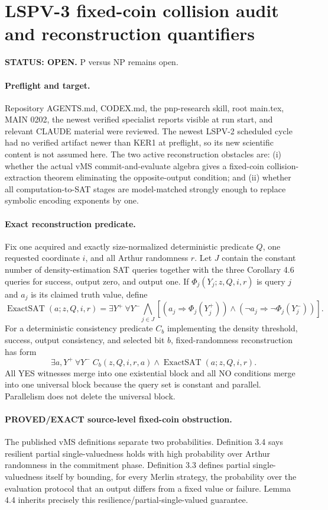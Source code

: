 \documentclass[11pt]{article}
\begin{document}
\section*{LSPV-3 fixed-coin collision audit and reconstruction quantifiers}
\textbf{STATUS: OPEN.} P versus NP remains open.

\paragraph{Preflight and target.}
Repository AGENTS.md, CODEX.md, the pnp-research skill, root main.tex, MAIN 0202, the newest verified specialist reports visible at run start, and relevant CLAUDE material were reviewed. The newest LSPV-2 scheduled cycle had no verified artifact newer than KER1 at preflight, so its new scientific content is not assumed here. The two active reconstruction obstacles are: (i) whether the actual vMS commit-and-evaluate algebra gives a fixed-coin collision-extraction theorem eliminating the opposite-output condition; and (ii) whether all computation-to-SAT stages are model-matched strongly enough to replace symbolic encoding exponents by one.

\paragraph{Exact reconstruction predicate.}
Fix one acquired and exactly size-normalized deterministic predicate $Q$, one requested coordinate $i$, and all Arthur randomness $r$. Let $J$ contain the constant number of density-estimation SAT queries together with the three Corollary 4.6 queries for success, output zero, and output one. If $\Phi_j(Y_j;z,Q,i,r)$ is query $j$ and $a_j$ is its claimed truth value, define
\[
\operatorname{ExactSAT}(a;z,Q,i,r)=
\exists Y^+\ \forall Y^-\!
\bigwedge_{j\in J}
\left[
(a_j\Rightarrow\Phi_j(Y_j^+))
\wedge
(\neg a_j\Rightarrow\neg\Phi_j(Y_j^-))
\right].
\]
For a deterministic consistency predicate $C_b$ implementing the density threshold, success, output consistency, and selected bit $b$, fixed-randomness reconstruction has form
\[
\exists a,Y^+\ \forall Y^-\;
C_b(z,Q,i,r,a)\wedge\operatorname{ExactSAT}(a;z,Q,i,r).
\]
All YES witnesses merge into one existential block and all NO conditions merge into one universal block because the query set is constant and parallel. Parallelism does not delete the universal block.

\paragraph{PROVED/EXACT source-level fixed-coin obstruction.}
The published vMS definitions separate two probabilities. Definition 3.4 says resilient partial single-valuedness holds with high probability over Arthur randomness in the commitment phase. Definition 3.3 defines partial single-valuedness itself by bounding, for every Merlin strategy, the probability over the evaluation protocol that an output differs from a fixed value or failure. Lemma 4.4 inherits precisely this resilience/partial-single-valued guarantee.
\end{document}
